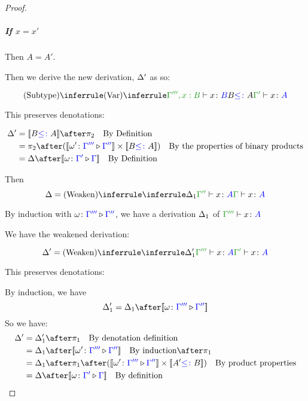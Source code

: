 \documentclass{report}
\begin{document}
\begin{framed}
\begin{proof}
            \subparagraph{If $x = x'$}
        
            Then $A = A'$.
        
            Then we derive the new derivation, $\Delta'$ as so:
        
            \begin{equation}
                \ntreeruleII{\vsubtype}{
                    \ntreeruleI{\vvar}{ }{\typerelation{\G''', x: B}{x}{B}}
                    }{
                    B \subtype A
                }{
                    \typerelation{\G'}{x}{A}
                }
            \end{equation}
        
            This preserves denotations:
        
            \begin{align*}
                \D' & = \deno{B\subtype A}\after\pp\qt{By Definition} \\
                 & = \pp\after (\deno{\wrel{\w'}{\G'''}{\G''}}\times \deno{B\subtype A}) \qt{By the properties of binary products}\\
                 & = \D\after\deno{\wrel{\w}{\G'}{\G}}\qt{By Definition}
            \end{align*}
        
            Then 
            \begin{equation}
                \D = \ntreeruleI{\vweaken}{\treeruleI{\D_1}{\typerelation{\G''}{x}{A}}}{\gtyperelation{x}{A}}
            \end{equation}
        
            By induction with $\omega \colon {\color{blue}\Gamma'''} \triangleright {\color {blue} \Gamma''}$,
             we have a derivation $\Delta_1$ of $\typerelation{\G'''}{x}{A}$
        
            We have the weakened derivation:
        
            \begin{equation}
                \D' = \ntreeruleI{\vweaken}{\treeruleI{\D_1'}{\typerelation{\G'''}{x}{A}}}{\typerelation{\G'}{x}{A}}
            \end{equation}
        
            This preserves denotations:
        
            By induction, we have
            \begin{equation}
                \D_1' = \D_1 \after \deno{\wrel{\w}{\G'''}{\G''}}
            \end{equation}
            So we have:
            \begin{align*}
                \D' &= \D_1' \after \p\qt{By denotation definition}\\
                & = \D_1\after\deno{\wrel{\w'}{\G'''}{\G''}}\qt{By induction}\after\p \\
                & = \D_1\after\p\after(\deno{\wrel{\w'}{\G'''}{\G''}}\times\deno{A' \subtype B})\qt{By product properties}\\
                & = \D\after\deno{\wrel{\w}{\G'}{\G}}\qt{By definition}
            \end{align*}
        

\end{proof}
\end{framed}
\end{document}
